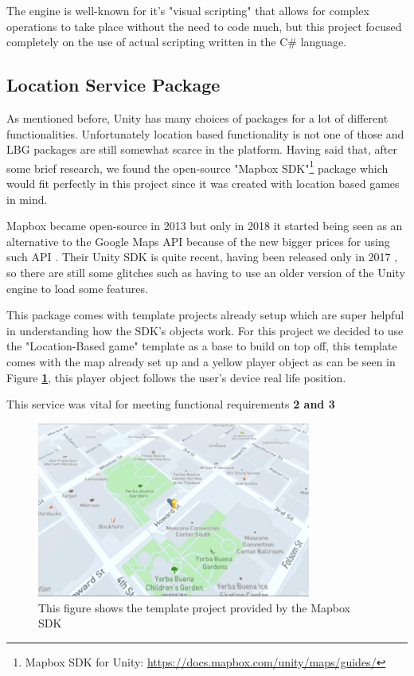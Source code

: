 \documentclass{dissertation}
\begin{document}
The engine is well-known for it's "visual scripting" that allows for complex operations to take place without the need to code much, but this project focused completely on the use of actual scripting written in the C\# language.

\subsection{Location Service Package}
As mentioned before, Unity has many choices of packages for a lot of different functionalities. Unfortunately location based functionality is not one of those and LBG packages are still somewhat scarce in the platform. Having said that, after some brief research, we found the open-source "Mapbox SDK"\footnote{Mapbox SDK for Unity: \url{https://docs.mapbox.com/unity/maps/guides/}} package which would fit perfectly in this project since it was created with location based games in mind. 

Mapbox became open-source in 2013 but only in 2018 it started being seen as an alternative to the Google Maps API because of the new bigger prices for using such API \citep{Bulatovych19}. Their Unity SDK is quite recent, having been released only in 2017 \citep{Mapbox21}, so there are still some glitches such as having to use an older version of the Unity engine to load some features. 

This package comes with template projects already setup which are super helpful in understanding how the SDK's objects work. For this project we decided to use the "Location-Based game" template as a base to build on top off, this template comes with the map already set up and a yellow player object as can be seen in Figure \textbf{\ref{fig:mapbox-unity}}, this player object follows the user's device real life position.

This service was vital for meeting functional requirements \textbf{2 and 3}

\begin{figure}[H]
\centering
\includegraphics[width = 9cm]{images/mapbox-unity.png}
\caption{This figure shows the template project provided by the Mapbox SDK}
\label{fig:mapbox-unity}
\end{figure}
\end{document}
